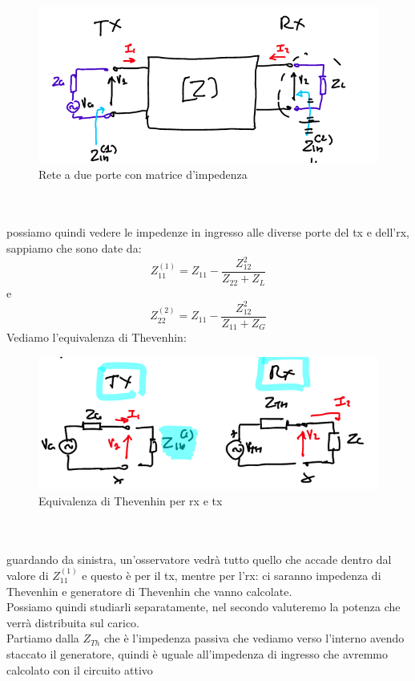\documentclass[oneside, 12pt]{extbook}
\begin{document}
\begin{figure}
	\includegraphics[scale=0.5]{immagini/rete_dp_matr.png}
	\caption{Rete a due porte con matrice d'impedenza}
\end{figure}
\\\\possiamo quindi vedere le impedenze in ingresso alle diverse porte del tx e dell'rx, sappiamo che sono date da:
\begin{equation}
	Z_{11}^{(1)} = Z_{11} - \frac{Z_{12}^2}{Z_{22}+Z_L}	
\end{equation}
e 
\begin{equation}
	Z_{22}^{(2)} = Z_{11} - \frac{Z_{12}^2}{Z_{11}+Z_G}	
\end{equation}
Vediamo l'equivalenza di Thevenhin:\\
\begin{figure}
	\includegraphics[scale=0.6]{immagini/equiv_thev_rx_tx.png}
	\caption{Equivalenza di Thevenhin per rx e tx}
\end{figure}
\\\\guardando da sinistra, un'osservatore vedrà tutto quello che accade dentro dal valore di $Z_{11}^{(1)}$ e questo è per il tx, mentre per l'rx: ci saranno impedenza di Thevenhin e generatore di Thevenhin che vanno calcolate.\\Possiamo quindi studiarli separatamente, nel secondo valuteremo la potenza che verrà distribuita sul carico.\\Partiamo dalla $Z_{Th}$ che è l'impedenza passiva che vediamo verso l'interno avendo staccato il generatore, quindi è uguale all'impedenza di ingresso che avremmo calcolato con il circuito attivo 
\end{document}
